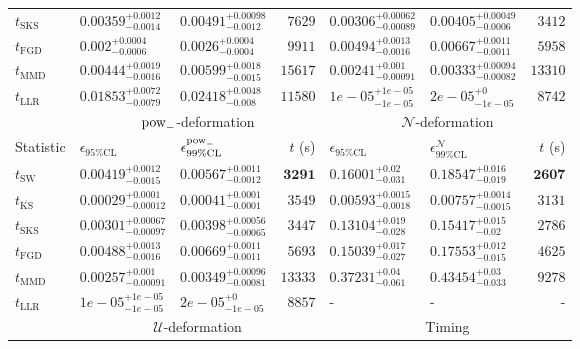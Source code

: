 \begin{tabular}{l|llr|llr}
	$t_{\mathrm{SKS}}$ & $0.00359_{-0.0014}^{+0.0012}$ & $0.00491_{-0.0012}^{+0.00098}$ & $7629$ & $0.00306_{-0.00089}^{+0.00062}$ & $0.00405_{-0.0006}^{+0.00049}$ & $3412$ \\
	$t_{\mathrm{FGD}}$ & ${\mathbf{0.002_{-0.0006}^{+0.0004}}}$ & ${\mathbf{0.0026_{-0.0004}^{+0.0004}}}$ & $9911$ & $0.00494_{-0.0016}^{+0.0013}$ & $0.00667_{-0.0011}^{+0.0011}$ & $5958$ \\
	$t_{\mathrm{MMD}}$ & $0.00444_{-0.0016}^{+0.0019}$ & $0.00599_{-0.0015}^{+0.0018}$ & $15617$ & $0.00241_{-0.00091}^{+0.001}$ & $0.00333_{-0.00082}^{+0.00094}$ & $13310$ \\
	$t_{\mathrm{LLR}}$ & $0.01853_{-0.0079}^{+0.0072}$ & $0.02418_{-0.008}^{+0.0048}$ & $11580$ & $1e-05_{-1e-05}^{+1e-05}$ & $2e-05_{-1e-05}^{+0}$ & $8742$ \\
	\toprule
	\multicolumn{1}{c}{} & \multicolumn{3}{c}{$\rm{pow}_{-}$-deformation} & \multicolumn{3}{c}{$\mathcal{N}$-deformation} \\
	Statistic & $\epsilon_{95\%\mathrm{CL}}$ & $\epsilon^  {\rm{pow}_{-}}_{99\%\mathrm{CL}}$ & $t$ (s) & $\epsilon_{95\%\mathrm{CL}}$ & $\epsilon^    {\mathcal{N}}_{99\%\mathrm{CL}}$ & $t$ (s) \\
	\midrule
	$t_{\mathrm{SW}}$ & $0.00419_{-0.0015}^{+0.0012}$ & $0.00567_{-0.0012}^{+0.0011}$ & ${\mathbf{3291}}$ & $0.16001_{-0.031}^{+0.02}$ & $0.18547_{-0.019}^{+0.016}$ & ${\mathbf{2607}}$ \\
	$t_{\overline{\mathrm{KS}}}$ & ${\mathbf{0.00029_{-0.00012}^{+0.0001}}}$ & ${\mathbf{0.00041_{-0.0001}^{+0.0001}}}$ & $3549$ & ${\mathbf{0.00593_{-0.0018}^{+0.0015}}}$ & ${\mathbf{0.00757_{-0.0015}^{+0.0014}}}$ & $3131$ \\
	$t_{\mathrm{SKS}}$ & $0.00301_{-0.00097}^{+0.00067}$ & $0.00398_{-0.00065}^{+0.00056}$ & $3447$ & $0.13104_{-0.028}^{+0.019}$ & $0.15417_{-0.02}^{+0.015}$ & $2786$ \\
	$t_{\mathrm{FGD}}$ & $0.00488_{-0.0016}^{+0.0013}$ & $0.00669_{-0.0011}^{+0.0011}$ & $5693$ & $0.15039_{-0.027}^{+0.017}$ & $0.17553_{-0.015}^{+0.012}$ & $4625$ \\
	$t_{\mathrm{MMD}}$ & $0.00257_{-0.00091}^{+0.001}$ & $0.00349_{-0.00081}^{+0.00096}$ & $13333$ & $0.37231_{-0.061}^{+0.04}$ & $0.43454_{-0.033}^{+0.03}$ & $9278$ \\
	$t_{\mathrm{LLR}}$ & $1e-05_{-1e-05}^{+1e-05}$ & $2e-05_{-1e-05}^{+0}$ & $8857$ & - & - & - \\
	\toprule
	\multicolumn{1}{c}{} & \multicolumn{3}{c}{$\mathcal{U}$-deformation} & \multicolumn{3}{c}{Timing} \\

\end{tabular}
